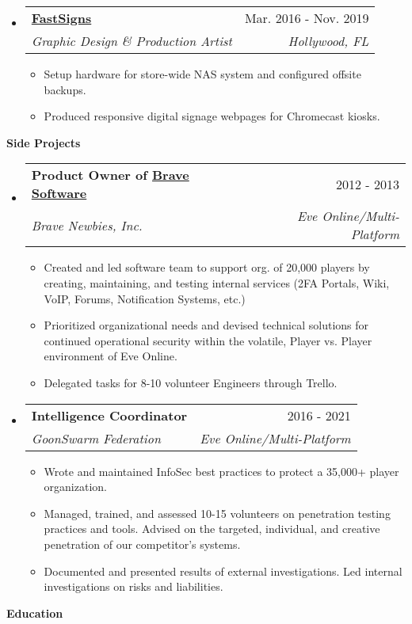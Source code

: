 \documentclass[letterpaper,10pt]{article}[leftmargin=*]
\makeatletter
\def \entryspacing {-0pt}
\renewcommand{\section}[2]{\vspace{5pt}
  \colorbox{secondary}{\color{white}\raggedbottom\normalsize\textbf{{#1}{\hspace{7pt}#2}}}
}
\newcommand{\resumeEntryStart}{\begin{itemize}[leftmargin=2.5mm]}
\newcommand{\resumeEntryEnd}{\end{itemize}\vspace{\entryspacing}}
\newcommand{\resumeItemListStart}{\begin{itemize}[leftmargin=4.5mm]}
\newcommand{\resumeItemListEnd}{\end{itemize}}
\newcommand{\resumeItem}[1]{
  \item\small{
    {#1 \vspace{-2pt}}
  }
}
\newcommand{\resumeEntryTSDL}[4]{
  \vspace{-1pt}\item[]
    \begin{tabularx}{0.97\textwidth}{X@{\hspace{60pt}}r}
      \textbf{\color{primary}#1} & {\firabook\color{accent}\small#2} \\
      \textit{\color{accent}\small#3} & \textit{\color{accent}\small#4} \\
    \end{tabularx}\vspace{-6pt}
}
\makeatother
\begin{document}
  \resumeEntryStart
    \resumeEntryTSDL
      {\href{https://www.fastsigns.com/hollywood-fl/}{FastSigns}}{Mar. 2016 - Nov. 2019}
      {Graphic Design \& Production Artist}{Hollywood, FL}
    \resumeItemListStart
      \resumeItem {Setup hardware for store-wide NAS system and configured offsite backups.}
      \resumeItem {Produced responsive digital signage webpages for Chromecast kiosks.}
    \resumeItemListEnd
  \resumeEntryEnd


\section{\faFlask}{Side Projects}

  \resumeEntryStart
    \resumeEntryTSDL
      {Product Owner of \href{https://github.com/bravecollective}{Brave Software} }{2012 - 2013}
      {Brave Newbies, Inc.}{Eve Online/Multi-Platform}
    \resumeItemListStart
      \resumeItem {Created and led software team to support org. of 20,000 players by creating, maintaining, and testing internal services (2FA Portals, Wiki, VoIP, Forums, Notification Systems, etc.)}
      \resumeItem {Prioritized organizational needs and devised technical solutions for continued operational security within the volatile, Player vs. Player environment of Eve Online.}
      \resumeItem {Delegated tasks for 8-10 volunteer Engineers through Trello.}
    \resumeItemListEnd
  \resumeEntryEnd

  \resumeEntryStart
    \resumeEntryTSDL
      {Intelligence Coordinator}{2016 - 2021}
      {GoonSwarm Federation}{Eve Online/Multi-Platform}
    \resumeItemListStart
      \resumeItem {Wrote and maintained InfoSec best practices to protect a 35,000+ player organization. }
      \resumeItem {Managed, trained, and assessed 10-15 volunteers on penetration testing practices and tools. Advised on the targeted, individual, and creative penetration of our competitor's systems. }
      \resumeItem{Documented and presented results of external investigations. Led internal investigations on risks and liabilities. }
    \resumeItemListEnd
  \resumeEntryEnd

\section{\faGraduationCap}{Education}
\end{document}
